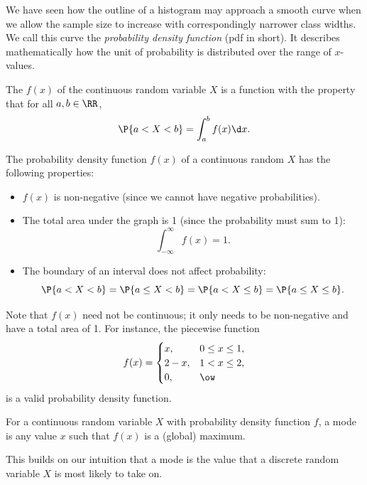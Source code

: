 We have seen how the outline of a histogram may approach a smooth curve when we allow the sample size to increase with correspondingly narrower class widths. We call this curve the \emph{probability density function} (pdf in short). It describes mathematically how the unit of probability is distributed over the range of $x$-values. 

\begin{definition}
    The  $f(x)$ of the continuous random variable $X$ is a function with the property that for all $a, b \in \RR$, \[\P{a < X < b} = \int_a^b f(x) \d x.\]
\end{definition}

The probability density function $f(x)$ of a continuous random $X$ has the following properties:

\begin{fact}
    \phantom{.}
    \begin{itemize}
        \item $f(x)$ is non-negative (since we cannot have negative probabilities).
        \item The total area under the graph is 1 (since the probability must sum to 1): \[\int_{-\infty}^{\infty} f(x) = 1.\]
        \item The boundary of an interval does not affect probability: \[\P{a < X < b} = \P{a \leq X < b} = \P{a < X \leq b} = \P{a \leq X \leq b}.\]
    \end{itemize}
\end{fact}

Note that $f(x)$ need not be continuous; it only needs to be non-negative and have a total area of 1. For instance, the piecewise function \[f(x) = \begin{cases}
    x, & 0 \leq x \leq 1,\\
    2-x, & 1 < x \leq 2,\\
    0, & \ow
\end{cases}\] is a valid probability density function.

\begin{definition}
    For a continuous random variable $X$ with probability density function $f$, a mode is any value $x$ such that $f(x)$ is a (global) maximum.
\end{definition}

This builds on our intuition that a mode is the value that a discrete random variable $X$ is most likely to take on.

